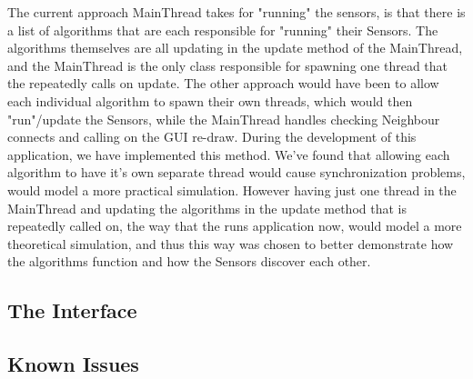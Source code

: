 The current approach MainThread takes for "running" the sensors, is that there is a list of algorithms that are each responsible for "running" their Sensors. The algorithms themselves are all updating in the update method of the MainThread, and the MainThread is the only class responsible for spawning one thread that the repeatedly calls on update. The other approach would have been to allow each individual algorithm to spawn their own threads, which would then "run"/update the Sensors, while the MainThread handles checking Neighbour connects and calling on the GUI re-draw. During the development of this application, we have implemented this method. We've found that allowing each algorithm to have it's own separate thread would cause synchronization problems, would model a more practical simulation. However having just one thread in the MainThread and updating the algorithms in the update method that is repeatedly called on, the way that the runs application now, would model a more theoretical simulation, and thus this way was chosen to better demonstrate how the algorithms function and how the Sensors discover each other.

\subsection{The Interface}

\subsection{Known Issues}
 